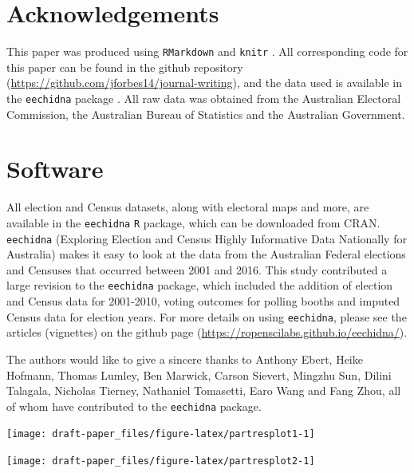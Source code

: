 \documentclass[11pt,a4paper,]{article}
\let\origfigure\figure
\let\endorigfigure\endfigure
\renewenvironment{figure}[1][2] {
    \expandafter\origfigure\expandafter[H]
} {
    \endorigfigure
}
\begin{document}
\hypertarget{acknowledgements}{%
\section{Acknowledgements}\label{acknowledgements}}

This paper was produced using \texttt{RMarkdown} \autocite{rmarkdown} and \texttt{knitr} \autocite{knitr}. All corresponding code for this paper can be found in the github repository (\url{https://github.com/jforbes14/journal-writing}), and the data used is available in the \texttt{eechidna} package \autocite{eechidna}. All raw data was obtained from the Australian Electoral Commission, the Australian Bureau of Statistics and the Australian Government.

\hypertarget{software}{%
\section{Software}\label{software}}

All election and Census datasets, along with electoral maps and more, are available in the \texttt{eechidna} \texttt{R} package, which can be downloaded from CRAN. \texttt{eechidna} (Exploring Election and Census Highly Informative Data Nationally for Australia) makes it easy to look at the data from the Australian Federal elections and Censuses that occurred between 2001 and 2016. This study contributed a large revision to the \texttt{eechidna} package, which included the addition of election and Census data for 2001-2010, voting outcomes for polling booths and imputed Census data for election years. For more details on using \texttt{eechidna}, please see the articles (vignettes) on the github page (\url{https://ropenscilabs.github.io/eechidna/}).

The authors would like to give a sincere thanks to Anthony Ebert, Heike Hofmann, Thomas Lumley, Ben Marwick, Carson Sievert, Mingzhu Sun, Dilini Talagala, Nicholas Tierney, Nathaniel Tomasetti, Earo Wang and Fang Zhou, all of whom have contributed to the \texttt{eechidna} package.

\begin{figure}[h]

{\centering \texttt{[image: draft-paper\_files/figure-latex/partresplot1-1]} 

}

\caption{Partial residual plots for: income and unemployment, industry and type of work, and household mobility.}\label{fig:partresplot1}
\end{figure}

\begin{figure}[h]

{\centering \texttt{[image: draft-paper\_files/figure-latex/partresplot2-1]} 

}

\caption{Partial residual plots for: relationships and age, education and diversity.}\label{fig:partresplot2}
\end{figure}

\printbibliography
\end{document}
